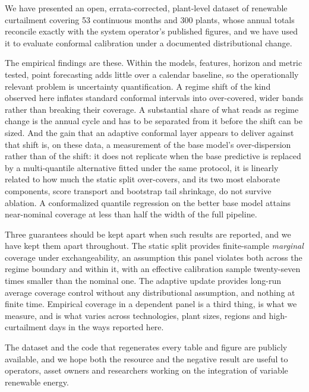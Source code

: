 \documentclass[preprint,3p,times]{elsarticle}
\begin{document}
We have presented an open, errata-corrected, plant-level dataset of renewable curtailment covering 53 continuous months and 300 plants, whose annual totals reconcile exactly with the system operator's published figures, and we have used it to evaluate conformal calibration under a documented distributional change.

The empirical findings are these. Within the models, features, horizon and metric tested, point forecasting adds little over a calendar baseline, so the operationally relevant problem is uncertainty quantification. A regime shift of the kind observed here inflates standard conformal intervals into over-covered, wider bands rather than breaking their coverage. A substantial share of what reads as regime change is the annual cycle and has to be separated from it before the shift can be sized. And the gain that an adaptive conformal layer appears to deliver against that shift is, on these data, a measurement of the base model's over-dispersion rather than of the shift: it does not replicate when the base predictive is replaced by a multi-quantile alternative fitted under the same protocol, it is linearly related to how much the static split over-covers, and its two most elaborate components, score transport and bootstrap tail shrinkage, do not survive ablation. A conformalized quantile regression on the better base model attains near-nominal coverage at less than half the width of the full pipeline.

Three guarantees should be kept apart when such results are reported, and we have kept them apart throughout. The static split provides finite-sample \emph{marginal} coverage under exchangeability, an assumption this panel violates both across the regime boundary and within it, with an effective calibration sample twenty-seven times smaller than the nominal one. The adaptive update provides long-run average coverage control without any distributional assumption, and nothing at finite time. Empirical coverage in a dependent panel is a third thing, is what we measure, and is what varies across technologies, plant sizes, regions and high-curtailment days in the ways reported here.

The dataset and the code that regenerates every table and figure are publicly available, and we hope both the resource and the negative result are useful to operators, asset owners and researchers working on the integration of variable renewable energy.

\end{document}
